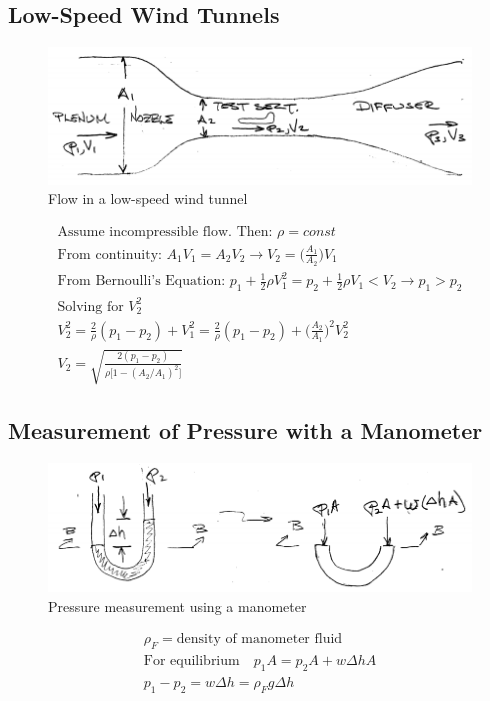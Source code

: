 \documentclass[draft=false, titlepage]{article}
\begin{document}
\subsection{Low-Speed Wind Tunnels}
\begin{figure}[ht]
	\centering
	\includegraphics[width=0.7\linewidth]{Figures/p9_lowSpeedWindTunnel.PNG}
	\caption{Flow in a low-speed wind tunnel}
	\label{fig:p9_lowSpeedWindTunnel}
\end{figure}

\begin{gather*}
\text{Assume incompressible flow. Then: } \rho = const\\
\text{From continuity: } A_1V_1 = A_2V_2 \rightarrow V_2 = \big(\frac{A_1}{A_2}\big)V_1\\
\text{From Bernoulli's Equation: } p_1 + \frac{1}{2}\rho V_1^2 = p_2 + \frac{1}{2}\rho %
V_1 < V_2 \rightarrow p_1 > p_2\\
\text{Solving for } V_2^2\\
V_2^2 = \frac{2}{\rho}(p_1-p_2) + V_1^2 = \frac{2}{\rho} (p_1-p_2) + \big(\frac{A_2}{A_1}\big)^2 V_2^2\\
\boxed{V_2 = \sqrt{\frac{2(p_1-p_2)}{\rho\big[ 1-(A_2/A_1)^2 \big]}}}
\end{gather*}

\subsection{Measurement of Pressure with a Manometer}
\begin{figure}[ht]
	\centering
	\includegraphics[width=0.7\linewidth]{Figures/p10_manometers.PNG}
	\caption{Pressure measurement using a manometer}
	\label{fig:p10_manometers}
\end{figure}
\begin{gather*}
\rho_F = \text{density of manometer fluid}\\
\text{For equilibrium} \quad p_1A = p_2A + w\Delta h A\\
\boxed{p_1-p_2 = w\Delta h = \rho_F g \Delta h}
\end{gather*}
\end{document}
